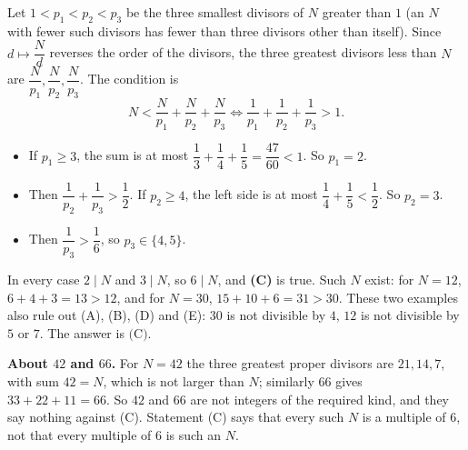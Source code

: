 Let $1<p_1<p_2<p_3$ be the three smallest divisors of $N$ greater than $1$ (an $N$ with fewer such divisors has fewer than three divisors other than itself). Since $d\mapsto\dfrac Nd$ reverses the order of the divisors, the three greatest divisors less than $N$ are $\dfrac{N}{p_1},\dfrac{N}{p_2},\dfrac{N}{p_3}$. The condition is
\[N<\dfrac{N}{p_1}+\dfrac{N}{p_2}+\dfrac{N}{p_3}\iff\dfrac{1}{p_1}+\dfrac{1}{p_2}+\dfrac{1}{p_3}>1.\]
\begin{itemize}
\item If $p_1\ge3$, the sum is at most $\dfrac13+\dfrac14+\dfrac15=\dfrac{47}{60}<1$. So $p_1=2$.
\item Then $\dfrac{1}{p_2}+\dfrac{1}{p_3}>\dfrac12$. If $p_2\ge4$, the left side is at most $\dfrac14+\dfrac15<\dfrac12$. So $p_2=3$.
\item Then $\dfrac{1}{p_3}>\dfrac16$, so $p_3\in\{4,5\}$.
\end{itemize}
In every case $2\mid N$ and $3\mid N$, so $6\mid N$, and \textbf{(C)} is true. Such $N$ exist: for $N=12$, $6+4+3=13>12$, and for $N=30$, $15+10+6=31>30$. These two examples also rule out (A), (B), (D) and (E): $30$ is not divisible by $4$, $12$ is not divisible by $5$ or $7$. The answer is $\boxed{\text{(C)}}$.

\textbf{About $42$ and $66$.} For $N=42$ the three greatest proper divisors are $21,14,7$, with sum $42=N$, which is not larger than $N$; similarly $66$ gives $33+22+11=66$. So $42$ and $66$ are not integers of the required kind, and they say nothing against (C). Statement (C) says that every such $N$ is a multiple of $6$, not that every multiple of $6$ is such an $N$.
